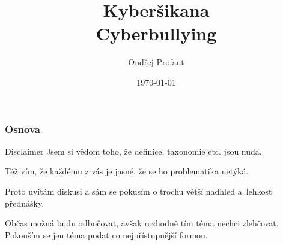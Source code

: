 \documentclass[xetex]{beamer}
\title{Kyberšikana\\Cyberbullying}
\author{Ondřej Profant}
\institute[Piráti]{Česká pirátská strana}
\date{\today}
\begin{document}
\begin{frame}
  \titlepage
\end{frame}

\begin{frame}
  \frametitle{Osnova}
  \tableofcontents
\end{frame}	

\begin{frame}
  \begin{block}{Disclaimer}
  Jsem si vědom toho, že definice, taxonomie etc. jsou nuda.

	\medskip

	Též vím, že každému z vás je jasné, že se ho problematika netýká.

	\medskip

	Proto uvítám diskusi a sám se pokusím o trochu větší nadhled a~lehkost přednášky. 

	\medskip

	Občas možná budu odbočovat, avšak rozhodně tím téma nechci zlehčovat. Pokouším se jen téma podat co nejpřístupnější formou.
	\end{block}
\end{frame}
\end{document}
